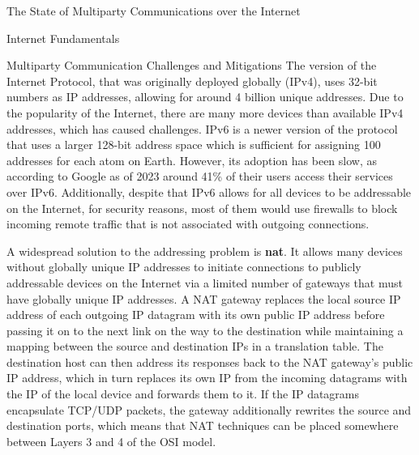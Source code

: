 \begin{frame}[fragile]{The State of Multiparty Communications over the
Internet}
\begin{block}{Internet Fundamentals}
\begin{block}{Multiparty Communication Challenges and Mitigations}
\protect\hypertarget{multiparty-communication-challenges-and-mitigations}{}
The version of the Internet Protocol, that was originally deployed
globally (IPv4), uses 32-bit numbers as IP addresses, allowing for
around 4 billion unique addresses. Due to the popularity of the
Internet, there are many more devices than available IPv4 addresses,
which has caused challenges. IPv6 is a newer version of the protocol
that uses a larger 128-bit address space which is sufficient for
assigning 100 addresses for each atom on Earth. However, its adoption
has been slow, as according to Google\autocite{IPv6Google} as of 2023
around 41\% of their users access their services over IPv6.
Additionally, despite that IPv6 allows for all devices to be addressable
on the Internet, for security reasons, most of them would use firewalls
to block incoming remote traffic that is not associated with outgoing
connections.

A widespread solution to the addressing problem is \textbf{\gls{nat}}.
It allows many devices without globally unique IP addresses to initiate
connections to publicly addressable devices on the Internet via a
limited number of gateways that must have globally unique IP addresses.
A NAT gateway replaces the local source IP address of each outgoing IP
datagram with its own public IP address before passing it on to the next
link on the way to the destination while maintaining a mapping between
the source and destination IPs in a translation table. The destination
host can then address its responses back to the NAT gateway's public IP
address, which in turn replaces its own IP from the incoming datagrams
with the IP of the local device and forwards them to it. If the IP
datagrams encapsulate TCP/UDP packets, the gateway additionally rewrites
the source and destination ports, which means that NAT techniques can be
placed somewhere between Layers 3 and 4 of the OSI model.


\end{block}
\end{block}
\end{frame}
